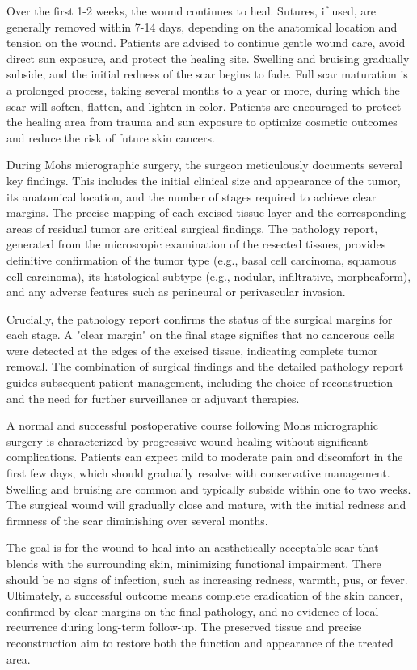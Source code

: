 Over the first 1-2 weeks, the wound continues to heal. Sutures, if used, are generally removed within 7-14 days, depending on the anatomical location and tension on the wound. Patients are advised to continue gentle wound care, avoid direct sun exposure, and protect the healing site. Swelling and bruising gradually subside, and the initial redness of the scar begins to fade. Full scar maturation is a prolonged process, taking several months to a year or more, during which the scar will soften, flatten, and lighten in color. Patients are encouraged to protect the healing area from trauma and sun exposure to optimize cosmetic outcomes and reduce the risk of future skin cancers.

During Mohs micrographic surgery, the surgeon meticulously documents several key findings. This includes the initial clinical size and appearance of the tumor, its anatomical location, and the number of stages required to achieve clear margins. The precise mapping of each excised tissue layer and the corresponding areas of residual tumor are critical surgical findings. The pathology report, generated from the microscopic examination of the resected tissues, provides definitive confirmation of the tumor type (e.g., basal cell carcinoma, squamous cell carcinoma), its histological subtype (e.g., nodular, infiltrative, morpheaform), and any adverse features such as perineural or perivascular invasion. 

Crucially, the pathology report confirms the status of the surgical margins for each stage. A "clear margin" on the final stage signifies that no cancerous cells were detected at the edges of the excised tissue, indicating complete tumor removal. The combination of surgical findings and the detailed pathology report guides subsequent patient management, including the choice of reconstruction and the need for further surveillance or adjuvant therapies.

A normal and successful postoperative course following Mohs micrographic surgery is characterized by progressive wound healing without significant complications. Patients can expect mild to moderate pain and discomfort in the first few days, which should gradually resolve with conservative management. Swelling and bruising are common and typically subside within one to two weeks. The surgical wound will gradually close and mature, with the initial redness and firmness of the scar diminishing over several months. 

The goal is for the wound to heal into an aesthetically acceptable scar that blends with the surrounding skin, minimizing functional impairment. There should be no signs of infection, such as increasing redness, warmth, pus, or fever. Ultimately, a successful outcome means complete eradication of the skin cancer, confirmed by clear margins on the final pathology, and no evidence of local recurrence during long-term follow-up. The preserved tissue and precise reconstruction aim to restore both the function and appearance of the treated area.

